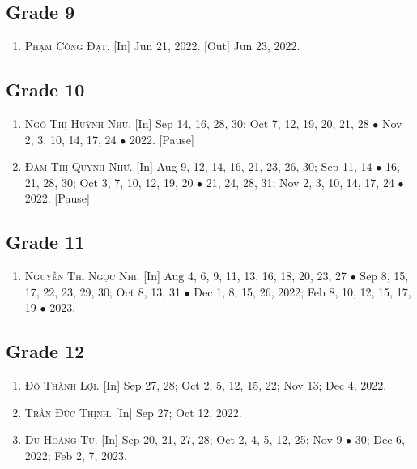\documentclass{article}
\numberwithin{equation}{section}
\begin{document}
\subsection{Grade 9}

\begin{enumerate}
	\item \textsc{Phạm Công Đạt.} \textsf{[In]} Jun 21, 2022. \textsf{[Out]} Jun 23, 2022.
\end{enumerate}

\subsection{Grade 10}

\begin{enumerate}
	\item \textsc{Ngô Thị Huỳnh Như.} \textsf{[In]} Sep 14, 16, 28, 30; Oct 7, 12, 19, 20, 21, 28 $\bullet$ Nov 2, 3, 10, 14, 17, 24 $\bullet$ 2022. \textsf{[Pause]}
	\item \textsc{Đàm Thị Quỳnh Như.} \textsf{[In]} Aug 9, 12, 14, 16, 21, 23, 26, 30; Sep 11, 14 $\bullet$ 16, 21, 28, 30; Oct 3, 7, 10, 12, 19, 20 $\bullet$ 21, 24, 28, 31; Nov 2, 3, 10, 14, 17, 24 $\bullet$ 2022. \textsf{[Pause]}
\end{enumerate}

\subsection{Grade 11}

\begin{enumerate}
	\item \textsc{Nguyễn Thị Ngọc Nhi.} \textsf{[In]} Aug 4, 6, 9, 11, 13, 16, 18, 20, 23, 27 $\bullet$ Sep 8, 15, 17, 22, 23, 29, 30; Oct 8, 13, 31 $\bullet$ Dec 1, 8,  15, 26, 2022; Feb 8, 10, 12, 15, 17, 19 $\bullet$ 2023.
\end{enumerate}

\subsection{Grade 12}

\begin{enumerate}
	\item \textsc{Đỗ Thành Lợi.} \textsf{[In]} Sep 27, 28; Oct 2, 5, 12, 15, 22; Nov 13; Dec 4, 2022.
	\item \textsc{Trần Đức Thịnh.} \textsf{[In]} Sep 27; Oct 12, 2022.
	\item \textsc{Du Hoàng Tú.} \textsf{[In]} Sep 20, 21, 27, 28; Oct 2, 4, 5, 12, 25; Nov 9 $\bullet$ 30; Dec 6, 2022; Feb 2, 7, 2023.
\end{enumerate}
\end{document}

